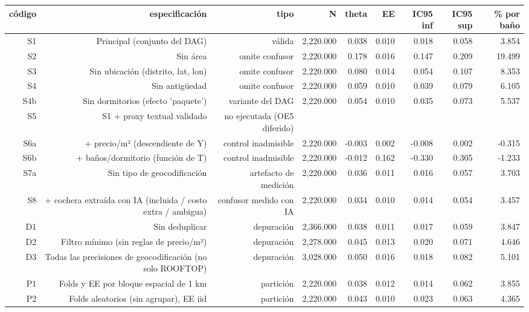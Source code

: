 \begin{tabular}{rrrrrrrrr}
\toprule
código & especificación & tipo & N & theta & EE & IC95 inf & IC95 sup & \% por baño \\
\midrule
S1 & Principal (conjunto del DAG) & válida & 2,220.000 & 0.038 & 0.010 & 0.018 & 0.058 & 3.854 \\
S2 & Sin área & omite confusor & 2,220.000 & 0.178 & 0.016 & 0.147 & 0.209 & 19.499 \\
S3 & Sin ubicación (distrito, lat, lon) & omite confusor & 2,220.000 & 0.080 & 0.014 & 0.054 & 0.107 & 8.353 \\
S4 & Sin antigüedad & omite confusor & 2,220.000 & 0.059 & 0.010 & 0.039 & 0.079 & 6.105 \\
S4b & Sin dormitorios (efecto 'paquete') & variante del DAG & 2,220.000 & 0.054 & 0.010 & 0.035 & 0.073 & 5.537 \\
S5 & S1 + proxy textual validado & no ejecutada (OE5 diferido) &  &  &  &  &  &  \\
S6a & + precio/m² (descendiente de Y) & control inadmisible & 2,220.000 & -0.003 & 0.002 & -0.008 & 0.002 & -0.315 \\
S6b & + baños/dormitorio (función de T) & control inadmisible & 2,220.000 & -0.012 & 0.162 & -0.330 & 0.305 & -1.233 \\
S7a & Sin tipo de geocodificación & artefacto de medición & 2,220.000 & 0.036 & 0.011 & 0.016 & 0.057 & 3.703 \\
S8 & + cochera extraída con IA (incluida / costo extra / ambigua) & confusor medido con IA & 2,220.000 & 0.034 & 0.010 & 0.014 & 0.054 & 3.457 \\
D1 & Sin deduplicar & depuración & 2,366.000 & 0.038 & 0.011 & 0.017 & 0.059 & 3.847 \\
D2 & Filtro mínimo (sin reglas de precio/m²) & depuración & 2,278.000 & 0.045 & 0.013 & 0.020 & 0.071 & 4.646 \\
D3 & Todas las precisiones de geocodificación (no solo ROOFTOP) & depuración & 3,028.000 & 0.050 & 0.016 & 0.018 & 0.082 & 5.101 \\
P1 & Folds y EE por bloque espacial de 1 km & partición & 2,220.000 & 0.038 & 0.012 & 0.014 & 0.062 & 3.855 \\
P2 & Folds aleatorios (sin agrupar), EE iid & partición & 2,220.000 & 0.043 & 0.010 & 0.023 & 0.063 & 4.365 \\
\bottomrule
\end{tabular}